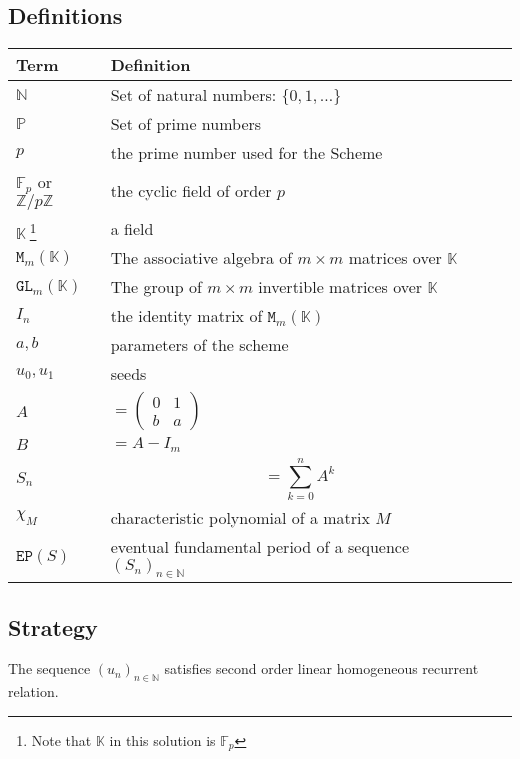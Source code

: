 \documentclass[]{article}
\begin{document}
\subsection{Definitions}
\begin{tabularx}{0.8\textwidth} { 
		| >{\raggedright\arraybackslash}X 
		| >{\centering\arraybackslash}X 
		| >{\raggedleft\arraybackslash}X | }
	\hline
	Term & Definition \\
	\hline
	$\mathbb{N}$ & Set of natural numbers: $\{0,1,\dots\}$  \\
	\hline
	
	$\mathbb{P}$ & Set of prime numbers  \\
	\hline
	$p$ & the prime number used for the Scheme  \\
	\hline
	$\mathbb{F}_p$ or $\mathbb{Z}/p\mathbb{Z}$ & the cyclic field of order $p$  \\
	\hline
	$\mathbb{K} \ $\footnote{Note that $\mathbb{K}$ in this solution is $\mathbb{F}_p$} & a field  \\
	\hline
	$\mathtt{M}_m(\mathbb{K})$ & The associative algebra of $m\times m$ matrices over $\mathbb{K}$  \\
	\hline
	$\mathtt{GL}_m(\mathbb{K})$ & The group of $m\times m$ invertible matrices over $\mathbb{K}$  \\
	\hline
		$I_n$ & the identity matrix of 	$\mathtt{M}_m(\mathbb{K})$ \\
\hline
	$a,b$ & parameters of the scheme \\
\hline
	$u_0,u_1$ & seeds \\
\hline
	$A$ & $=\begin{pmatrix} 0&1 \\ b&a\end{pmatrix}$ \\
\hline
	$B$ & $=A-I_m$ \\
\hline
	$S_n$ & $$=\sum_{k=0}^n A^k$$ \\
\hline
	$\chi_M$ & characteristic polynomial of a matrix $M$  \\
\hline
	$\mathtt{EP}(S)$ & eventual fundamental period of a sequence $(S_n)_{n\in\mathbb{N}}$  \\
\hline
\end{tabularx}
\subsection{Strategy}
The sequence $(u_n)_{n\in\mathbb{N}}$ satisfies second order linear homogeneous recurrent relation.
\end{document}
